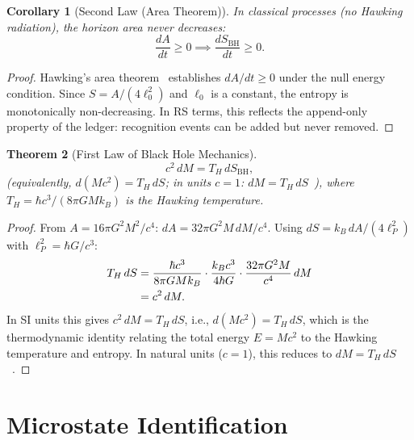 \documentclass[12pt,a4paper]{article}
\newtheorem{theorem}{Theorem}[section]
\newtheorem{corollary}[theorem]{Corollary}
\theoremstyle{definition}
\theoremstyle{remark}
\begin{document}
\begin{corollary}[Second Law (Area Theorem)]
\label{thm:second-law}
In classical processes (no Hawking radiation), the horizon
area never decreases:
\begin{equation}
  \frac{dA}{dt} \geq 0 \implies \frac{dS_{\mathrm{BH}}}{dt}
  \geq 0.
\end{equation}
\end{corollary}

\begin{proof}
Hawking's area theorem~\cite{Hawking1971} establishes
$dA/dt \geq 0$ under the null energy condition.  Since
$S = A/(4\ell_0^2)$ and $\ell_0$ is a constant, the
entropy is monotonically non-decreasing.  In RS terms,
this reflects the append-only property of the ledger:
recognition events can be added but never removed.
\end{proof}

\begin{theorem}[First Law of Black Hole Mechanics]
\label{thm:first-law}
\begin{equation}
  c^2\,dM = T_H\,dS_{\mathrm{BH}},
  \label{eq:first-law}
\end{equation}
(equivalently, $d(Mc^2) = T_H\,dS$; in units $c = 1$:
$dM = T_H\,dS$~\cite{Bardeen1973}), where
$T_H = \hbar c^3/(8\pi G M k_B)$ is the Hawking temperature.
\end{theorem}

\begin{proof}
From $A = 16\pi G^2 M^2/c^4$: $dA = 32\pi G^2 M\,dM/c^4$.
Using $dS = k_B\,dA/(4\ell_P^2)$ with $\ell_P^2 = \hbar G/c^3$:
\begin{align}
  T_H\,dS &= \frac{\hbar c^3}{8\pi G M k_B}
  \cdot \frac{k_B c^3}{4\hbar G}
  \cdot \frac{32\pi G^2 M}{c^4}\,dM \notag \\
  &= c^2\,dM. \notag
\end{align}
In SI units this gives $c^2\,dM = T_H\,dS$, i.e., $d(Mc^2) = T_H\,dS$,
which is the thermodynamic identity relating the total energy $E = Mc^2$
to the Hawking temperature and entropy.  In natural units ($c = 1$),
this reduces to $dM = T_H\,dS$~\cite{Bardeen1973}.
\end{proof}

\section{Microstate Identification}
\label{sec:microstates}
\end{document}
